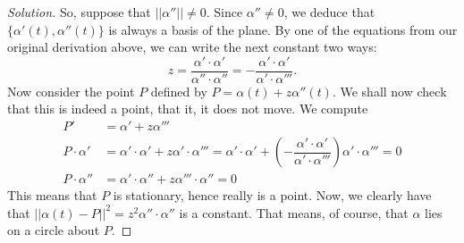 \documentclass[Shifrin_Solutions_Spring_2018]{subfiles}
\begin{document}
\begin{proof}[Solution]
So, suppose that $||\alpha''||\neq 0$. Since $\alpha'' \neq 0$, we deduce that $\{ \alpha'(t), \alpha''(t) \}$ is always a basis of the plane.
By one of the equations from our original derivation above, we can write the next constant two ways:
\[
z = \dfrac{\alpha'\cdot \alpha'}{\alpha''\cdot\alpha''} = - \dfrac{\alpha'\cdot \alpha'}{\alpha' \cdot \alpha'''} .
\]
Now consider the point $P$ defined by $ P = \alpha(t) + z \alpha''(t)$. We shall now check that this is indeed a point, that it, it does not move.
We compute
\begin{align*}
P'  & = \alpha' + z \alpha''' \\
P \cdot \alpha'& = \alpha' \cdot \alpha' + z \alpha' \cdot \alpha''' = \alpha' \cdot \alpha' + \left( - \dfrac{\alpha'\cdot \alpha'}{\alpha' \cdot \alpha'''} \right) \alpha' \cdot \alpha''' = 0 \\
P \cdot \alpha'' &  = \alpha' \cdot \alpha'' + z \alpha'''\cdot \alpha'' = 0
\end{align*}
This means that $P$ is stationary, hence really is a point. Now, we clearly have that $||\alpha(t) - P ||^2 = z^2 \alpha'' \cdot \alpha'' $ is a constant. That means, of course, that $\alpha$ lies on a circle about $P$.
\end{proof}


\vfill
\end{document}

